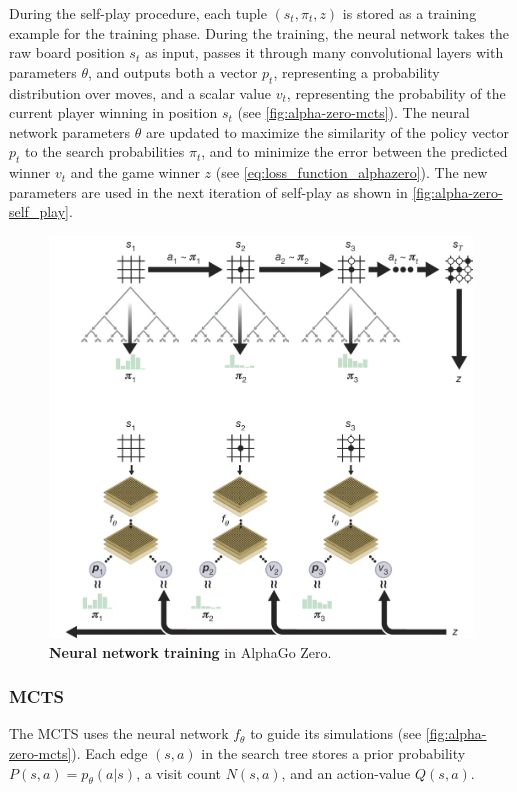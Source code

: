 \documentclass{article}
\begin{document}
During the self-play procedure, each tuple $(s_t, \pi_t, z)$ is stored as a training example for the training phase. During the training, the neural network takes the raw board position $s_t$ as input, passes it through many convolutional layers with parameters $\theta$, and outputs both a vector $p_t$, representing a probability distribution over moves, and a scalar value $v_t$, representing the probability of the current player winning in position $s_t$ (see \autoref{fig:alpha-zero-mcts}). The neural network parameters $\theta$ are updated to maximize the similarity of the policy vector $p_t$ to the search probabilities $\pi_t$, and to minimize the error between the predicted winner $v_t$ and the game winner $z$ (see \autoref{eq:loss_function_alphazero}). The new parameters are used in the next iteration of self-play as shown in \autoref{fig:alpha-zero-self_play}.

\begin{figure}[H]
	\centering
	\includegraphics[width=12cm,trim={0px 0px 0px 280px},clip]{alpha_go_zero_training.png}
	
	\caption{\textbf{Neural network training} in AlphaGo Zero.\cite{Silver_2016}}
\end{figure}


\subsubsection{MCTS}
The MCTS uses the neural network $f_\theta$ to guide its simulations (see \autoref{fig:alpha-zero-mcts}). Each edge $(s, a)$ in the search tree stores a prior probability $P(s, a) = p_\theta(a | s)$, a visit count $N(s, a)$, and an action-value $Q(s, a)$. 
\end{document}
